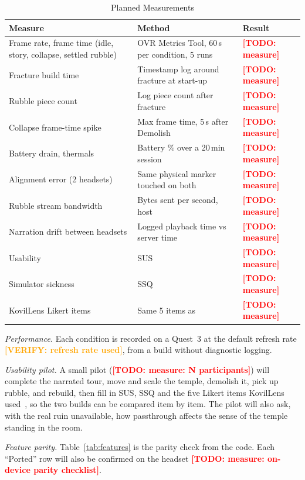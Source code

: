 \documentclass[conference]{IEEEtran}
\newcommand{\TODO}[1]{\textcolor{red}{\textbf{[TODO: #1]}}}
\newcommand{\VERIFY}[1]{\textcolor{orange}{\textbf{[VERIFY#1]}}}
\begin{document}
\begin{table}[t]
\caption{Planned Measurements}
\label{tab:eval}
\centering\footnotesize
\setlength{\tabcolsep}{3pt}
\begin{tabular}{@{}p{2.45cm}p{3.35cm}p{1.75cm}@{}}
\toprule
\textbf{Measure} & \textbf{Method} & \textbf{Result} \\
\midrule
Frame rate, frame time (idle, story, collapse, settled rubble) & OVR Metrics Tool, 60\,s per condition, 5 runs & \TODO{measure} \\
Fracture build time & Timestamp log around fracture at start-up & \TODO{measure} \\
Rubble piece count & Log piece count after fracture & \TODO{measure} \\
Collapse frame-time spike & Max frame time, 5\,s after Demolish & \TODO{measure} \\
Battery drain, thermals & Battery \% over a 20\,min session & \TODO{measure} \\
Alignment error (2 headsets) & Same physical marker touched on both & \TODO{measure} \\
Rubble stream bandwidth & Bytes sent per second, host & \TODO{measure} \\
Narration drift between headsets & Logged playback time vs server time & \TODO{measure} \\
Usability & SUS~\cite{brooke1996} & \TODO{measure} \\
Simulator sickness & SSQ~\cite{kennedy1993} & \TODO{measure} \\
KovilLens Likert items & Same 5 items as~\cite{kovillens2025} & \TODO{measure} \\
\bottomrule
\end{tabular}
\end{table}

\textit{Performance.} Each condition is recorded on a Quest~3 at the default refresh rate \VERIFY{: refresh rate used}, from a build without diagnostic logging.

\textit{Usability pilot.} A small pilot (\TODO{measure: N participants}) will complete the narrated tour, move and scale the temple, demolish it, pick up rubble, and rebuild, then fill in SUS, SSQ and the five Likert items KovilLens used~\cite{kovillens2025}, so the two builds can be compared item by item. The pilot will also ask, with the real ruin unavailable, how passthrough affects the sense of the temple standing in the room.

\textit{Feature parity.} Table~\ref{tab:features} is the parity check from the code. Each ``Ported'' row will also be confirmed on the headset \TODO{measure: on-device parity checklist}.
\end{document}
